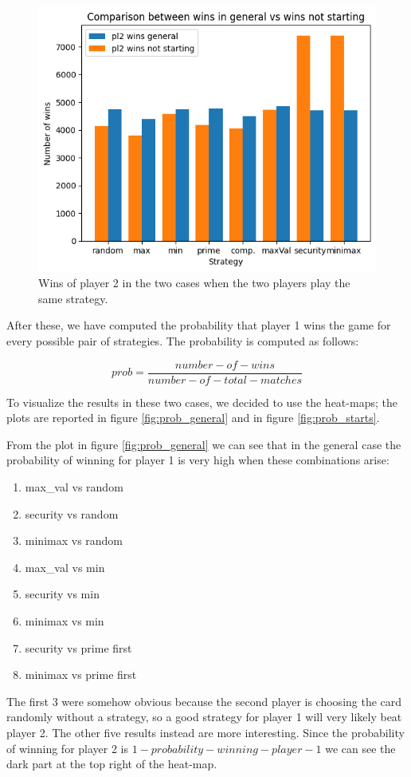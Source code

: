 \begin{figure}
    \centering
    \includegraphics[width=0.7\linewidth]{img/comparison_winning_not_starts_general_pl2.png}
    \caption{Wins of player 2 in the two cases when the two players play the same strategy.}
    \label{fig:comparison_pl2}
\end{figure}

After these, we have computed the probability that player 1 wins the game for every possible pair of strategies. The probability is computed as follows:

\begin{equation} \label{eq:probability_cal}
    prob = \frac{number-of-wins}{number-of-total-matches}
\end{equation}

To visualize the results in these two cases, we decided to use the heat-maps; the plots are reported in figure \ref{fig:prob_general} and in figure \ref{fig:prob_starts}. 

From the plot in figure \ref{fig:prob_general} we can see that in the general case the probability of winning for player 1 is very high when these combinations arise:
\begin{enumerate}
    \item max\_val vs random
    \item security vs random
    \item minimax vs random
    \item max\_val vs min
    \item security vs min
    \item minimax vs min
    \item security vs prime first
    \item minimax vs prime first
\end{enumerate}
The first 3 were somehow obvious because the second player is choosing the card randomly without a strategy, so a good strategy for player 1 will very likely beat player 2. The other five results instead are more interesting. 
Since the probability of winning for player 2 is $1 - probability-winning-player-1$ we can see the dark part at the top right of the heat-map.

